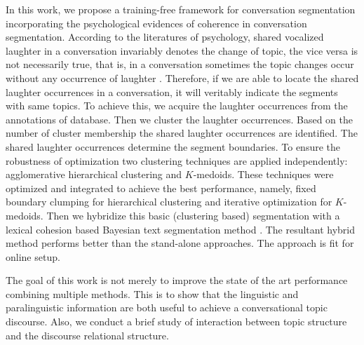 \documentclass{article}
\begin{document}
In this work, we propose a training-free framework for conversation segmentation incorporating the psychological evidences of coherence in conversation segmentation. According to the literatures of psychology, shared vocalized laughter in a conversation invariably denotes the change of topic, the vice versa is not necessarily true, that is, in a conversation sometimes the topic changes occur without any occurrence of laughter \cite{holt-10}. Therefore, if we are able to locate the shared laughter occurrences in a conversation, it will veritably indicate the segments with same topics. %
To achieve this, we acquire the laughter occurrences from the annotations of database. Then we cluster the laughter occurrences. Based on the number of cluster membership the shared laughter occurrences are identified. The shared laughter occurrences determine the segment boundaries. To ensure the robustness of optimization two clustering techniques are applied independently: agglomerative hierarchical clustering and $K$-medoids. These techniques were optimized and integrated to achieve the best performance, namely, fixed boundary clumping for hierarchical clustering and iterative optimization for $K$-medoids. 
Then we hybridize this basic (clustering based) segmentation with a lexical cohesion based Bayesian text segmentation method \cite{eisenstein-08}. The resultant hybrid method performs better than the stand-alone approaches. The approach is fit for online setup.%

The goal of this work is not merely to improve the state of the art performance combining multiple methods. This is to show that the linguistic and paralinguistic information are both useful to achieve a conversational topic discourse. Also, we conduct a brief study of interaction between topic structure and the discourse relational structure. %
\end{document}
